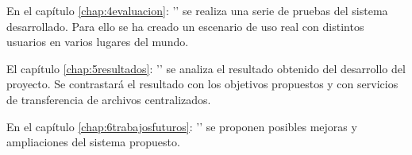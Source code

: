 En el capítulo \ref{chap:4evaluacion}: '' se realiza una
serie de pruebas del sistema desarrollado. Para ello se ha creado un escenario de uso real con distintos usuarios en varios lugares del mundo.

El capítulo \ref{chap:5resultados}: '' se analiza el resultado obtenido del desarrollo del proyecto. Se contrastará
el resultado con los objetivos propuestos y con servicios de transferencia de archivos centralizados.

En el capítulo \ref{chap:6trabajosfuturos}: '' se proponen posibles mejoras y ampliaciones del sistema propuesto.